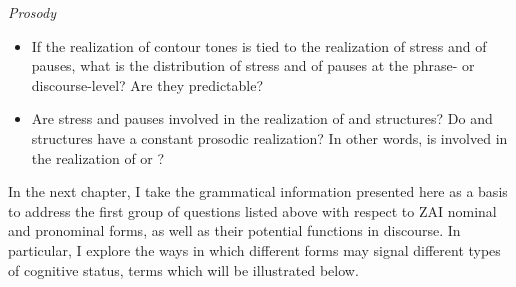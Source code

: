 \vspace{3mm}
\noindent \textit{Prosody}
\begin{itemize}
\item If the realization of contour tones is tied to the realization of stress and of pauses, what is the distribution of stress and of pauses at the phrase- or discourse-level? Are they predictable? 
\item Are stress and pauses involved in the realization of  and  structures? Do  and  structures have a constant prosodic realization? In other words, is  involved in the realization of  or ?
\end{itemize}


In the next chapter, I take the grammatical information presented here as a basis to address the first group of questions listed above with respect to ZAI nominal and pronominal forms, as well as their potential functions in discourse. In particular, I explore the ways in which different forms may signal different types of cognitive status, terms which will be illustrated below. 

